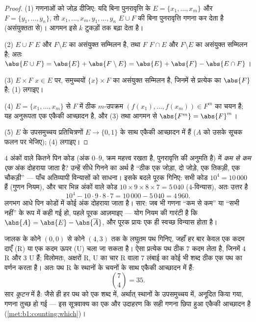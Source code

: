 \begin{proof}
(1) गणनाओं को जोड़ दीजिए: यदि बिना पुनरावृत्ति के $E = \{x_1, \dots, x_m\}$
और $F = \{y_1, \dots, y_n\}$, तो $x_1, \dots, x_m, y_1, \dots, y_n$ $E \cup
F$ की बिना पुनरावृत्ति गणना कर देता है (असंयुक्तता से)। आगमन इसे $k$ टुकड़ों
तक बढ़ा देता है।

(2) $E \cup F$ $E$ और $F \setminus E$ का असंयुक्त सम्मिलन है, तथा $F$ $F
\cap E$ और $F \setminus E$ का असंयुक्त सम्मिलन है; अतः $\abs{E \cup F} =
\abs{E} + \abs{F \setminus E} = \abs{E} + \abs{F} - \abs{E \cap F}$।

(3) $E \times F$ $x \in E$ पर, समुच्चयों $\{x\} \times F$ का असंयुक्त
सम्मिलन है, जिनमें से प्रत्येक का  $\abs{F}$ है; (1) लगाइए।

(4) $E = \{x_1, \dots, x_m\}$ से $F$ में  ठीक $m$-उपक्रम
$(f(x_1), \dots, f(x_m)) \in F^m$ का चयन है; यह अनुरूपता एक एकैकी आच्छादन
है, और (3) तथा आगमन से $\abs{F^m} = \abs{F}^m$।

(5) $E$ के उपसमुच्चय प्रतिचित्रणों $E \to \{0, 1\}$ के साथ एकैकी आच्छादन में
हैं ($A$ को उसके सूचक फलन पर भेजिए); (4) लगाइए।
\end{proof}

\begin{example}[पूरक द्वारा गणना]\label{ex:b1:counting:complement}
$4$ अंकों वाले कितने पिन कोड (अंक $0$--$9$, क्रम महत्त्व रखता है,
पुनरावृत्ति की अनुमति है) में \emph{कम से कम एक} अंक दोहराया जाता है? उन्हें
सीधे गिनने का अर्थ है ``ठीक एक जोड़ा, दो जोड़े, एक तिकड़ी, एक चौकड़ी'' ---
पाँच अतिव्यापी विन्यासों को साधना। इसके बदले पूरक गिनिए: सभी कोड $10^4 =
10\,000$ हैं (गुणन नियम), और चार भिन्न अंकों वाले कोड $10 \times 9 \times 8
\times 7 = 5\,040$ ($4$-विन्यास), अतः उत्तर है
\[
10^4 - 10 \cdot 9 \cdot 8 \cdot 7 = 10\,000 - 5\,040 = 4\,960 .
\]
लगभग आधे पिन कोडों में कोई अंक दोहराया जाता है। सार: जब भी गणना ``कम से कम''
या ``सभी नहीं'' के रूप में कही गई हो, पहले पूरक आज़माइए --- योग नियम की
गारंटी है कि $\abs{A} = \abs{E} - \abs{\overline A}$, और पूरक प्रायः एक ही
स्वच्छ विन्यास होता है।
\end{example}

\begin{example}[जालक पथ]\label{ex:b1:counting:paths}
जालक के कोने $(0,0)$ से कोने $(4, 3)$ तक के लघुतम पथ गिनिए, जहाँ हर बार केवल
एक कदम दाएँ (R) या एक कदम ऊपर (U) चला जा सकता है। ऐसा प्रत्येक पथ ठीक $7$
कदम लेता है, जिनमें $4$ R और $3$ U हैं; विलोमतः, अक्षरों R, U का चार R वाला
$7$ लंबाई का कोई भी शब्द ठीक एक पथ का वर्णन करता है। अतः पथ R के स्थानों के
चयनों के साथ एकैकी आच्छादन में हैं:
\[
\binom{7}{4} = 35 .
\]
सार \emph{कूटन} में है: जैसे ही हर पथ को एक शब्द में, अर्थात् स्थानों के
उपसमुच्चय में, अनूदित किया गया, गणना तुच्छ हो गई --- इस सूत्रवाक्य का एक और
उदाहरण कि सही गणना छिपा हुआ एकैकी आच्छादन है (\cref{met:b1:counting:which})।
\end{example}

